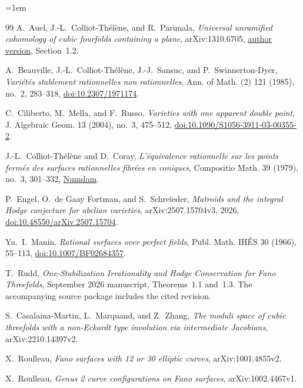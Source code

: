 \documentclass[11pt]{article}
\theoremstyle{remark}
\begin{document}
\begingroup
\footnotesize
\emergencystretch=1em
\raggedright
\begin{thebibliography}{99}
 A.~Auel, J.-L.~Colliot-Th\'el\`ene, and R.~Parimala,
\emph{Universal unramified cohomology of cubic fourfolds containing a plane},
arXiv:1310.6705,
\href{https://math.dartmouth.edu/~auel/papers/docs/ACTP_universaltriviality.pdf}
{author version}, Section~1.2.

 A.~Beauville, J.-L.~Colliot-Th\'el\`ene, J.-J.~Sansuc,
and P.~Swinnerton-Dyer,
\emph{Vari\'et\'es stablement rationnelles non rationnelles},
Ann. of Math. (2) 121 (1985), no.~2, 283--318,
\href{https://doi.org/10.2307/1971174}{doi:10.2307/1971174}.

 C.~Ciliberto, M.~Mella, and F.~Russo,
\emph{Varieties with one apparent double point},
J. Algebraic Geom. 13 (2004), no.~3, 475--512,
\href{https://doi.org/10.1090/S1056-3911-03-00355-2}
{doi:10.1090/S1056-3911-03-00355-2}.

 J.-L.~Colliot-Th\'el\`ene and D.~Coray,
\emph{L'\'equivalence rationnelle sur les points ferm\'es des surfaces
rationnelles fibr\'ees en coniques},
Compositio Math. 39 (1979), no.~3, 301--332,
\href{https://www.numdam.org/item/CM_1979__39_3_301_0/}{Numdam}.

 P.~Engel, O.~de Gaay Fortman, and S.~Schreieder,
\emph{Matroids and the integral Hodge conjecture for abelian varieties},
arXiv:2507.15704v3, 2026,
\href{https://doi.org/10.48550/arXiv.2507.15704}
{doi:10.48550/arXiv.2507.15704}.

 Yu.~I.~Manin,
\emph{Rational surfaces over perfect fields},
Publ. Math. IH\'ES 30 (1966), 55--113,
\href{https://doi.org/10.1007/BF02684357}
{doi:10.1007/BF02684357}.

 T.~Rudd,
\emph{One-Stabilization Irrationality and Hodge Conservation for Fano
Threefolds}, September 2026 manuscript, Theorems~1.1 and~1.3.
The accompanying source package includes the cited revision.

 S.~Casalaina-Martin, L.~Marquand, and Z.~Zhang,
\emph{The moduli space of cubic threefolds with a non-Eckardt type
involution via intermediate Jacobians}, arXiv:2210.14397v2.

 X.~Roulleau,
\emph{Fano surfaces with 12 or 30 elliptic curves}, arXiv:1001.4855v2.

 X.~Roulleau,
\emph{Genus 2 curve configurations on Fano surfaces}, arXiv:1002.4467v1.


\end{thebibliography}
\end{document}
